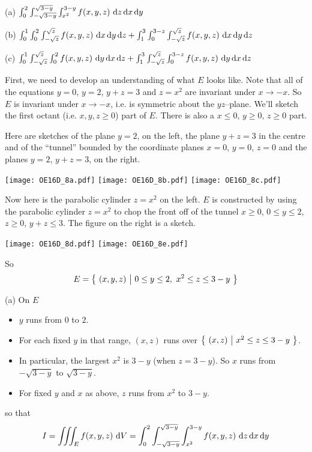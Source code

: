\begin{answer}
(a) $\int_0^2 \int_{-\sqrt{3-y}}^{\sqrt{3-y}} \int_{x^2}^{3-y} 
                 f(x,y,z)\ \mathrm{d}z\,\mathrm{d}x\,\mathrm{d}y$

(b) $\int_0^1 \int_0^2 \int_{-\sqrt{z}}^{\sqrt{z}} f(x,y,z)\    
                 \mathrm{d}x\,\mathrm{d}y\,\mathrm{d}z
     +\int_1^3 \int_0^{3-z} \int_{-\sqrt{z}}^{\sqrt{z}} f(x,y,z)\    
                 \mathrm{d}x\,\mathrm{d}y\,\mathrm{d}z$

(c) $\int_0^1  \int_{-\sqrt{z}}^{\sqrt{z}}\int_0^2 f(x,y,z)\    
                 \mathrm{d}y\,\mathrm{d}x\,\mathrm{d}z
    +\int_1^3 \int_{-\sqrt{z}}^{\sqrt{z}}  \int_0^{3-z} f(x,y,z)\    
                 \mathrm{d}y\,\mathrm{d}x\,\mathrm{d}z$
\end{answer}

\begin{solution}
First, we need to develop an understanding of what $E$ looks like.
Note that all of the equations $y=0$, $y=2$, $y+z=3$ and $z=x^2$
are invariant under $x\rightarrow -x$. So $E$ is invariant under 
$x\rightarrow -x$, i.e. is symmetric about the $yz$--plane. We'll sketch
the first octant (i.e. $x,y,z\ge 0$) part of $E$. There is also a
$x\le 0$, $y\ge 0$, $z\ge 0$ part.

Here are sketches of the plane $y=2$, on the left, 
the plane $y+z=3$ in the centre and of the ``tunnel''
bounded by the coordinate planes $x=0$, $y=0$, $z=0$ and the
planes $y=2$, $y+z=3$, on the right.
\begin{center}
     \texttt{[image: OE16D\_8a.pdf]}\quad 
     \texttt{[image: OE16D\_8b.pdf]}\quad 
     \texttt{[image: OE16D\_8c.pdf]}
\end{center}
Now here is the parabolic cylinder $z=x^2$ on the left.
$E$ is constructed by using the parabolic cylinder $z=x^2$ to chop the front
off of the tunnel $x\ge 0$, $0\le y\le 2$, $z\ge 0$,  $y+z\le 3$. The figure 
on the right is a sketch.
\begin{center}
     \texttt{[image: OE16D\_8d.pdf]}\qquad
     \texttt{[image: OE16D\_8e.pdf]}
\end{center}
So
\begin{equation*}
E=\big\{ \ (x,y,z)\ \big|\ 0\le y\le 2,\ x^2\le z\le 3-y\ \big\}
\end{equation*}

(a) On $E$
\begin{itemize}
\item 
$y$ runs from $0$ to $2$.
\item
For each fixed $y$ in that range, $(x,z)$ runs over
$\big\{ \ (x,z)\ \big|\ x^2\le z\le 3-y\ \big\}$.
\item 
In particular, the largest $x^2$ is $3-y$ (when $z=3-y$).
So $x$ runs from $-\sqrt{3-y}$ to $\sqrt{3-y}$.
\item
For fixed $y$ and $x$ as above, $z$ runs from $x^2$ to $3-y$.
\end{itemize}
so that
\begin{align*}
I=\tripInt_E f(x,y,z)\ \dee{V}
= \int_0^2 \int_{-\sqrt{3-y}}^{\sqrt{3-y}} \int_{x^2}^{3-y} f(x,y,z)\ \dee{z}\,\dee{x}\,\dee{y}
\end{align*}


\end{solution}
